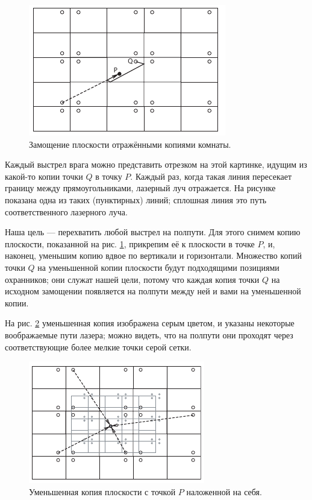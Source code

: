 \begin{figure}[t!]
\centering
\includegraphics[scale=1]{pics/room1}
\caption{Замощение плоскости отражёнными копиями комнаты.}
\label{pic:room1}
\end{figure}

Каждый выстрел врага можно представить отрезком на этой картинке, идущим из какой-то копии точки $Q$ в точку $P$.
Каждый раз, когда такая линия пересекает границу между прямоугольниками, лазерный луч отражается.
На рисунке показана одна из таких (пунктирных) линий; сплошная линия это путь соответственного лазерного луча.

Наша цель --- перехватить любой выстрел на полпути.
Для этого снимем копию плоскости, показанной на рис. \ref{pic:room1}, прикрепим её к плоскости в точке $P$, и, наконец, уменьшим копию вдвое по вертикали и горизонтали.
Множество копий точки $Q$ на уменьшенной копии плоскости будут подходящими позициями охранников;
они служат нашей цели, потому что каждая копия точки $Q$ на исходном замощении появляется на полпути между ней и вами на уменьшенной копии.


На рис. \ref{pic:room2} уменьшенная копия изображена серым цветом, и указаны некоторые воображаемые пути лазера; можно видеть, что на полпути они проходят через соответствующие более мелкие точки серой сетки.

\begin{figure}[t!]
\centering
\includegraphics[scale=1]{pics/room2}
\caption{Уменьшенная копия плоскости с точкой $P$ наложенной на себя.}
\label{pic:room2}
\end{figure}

